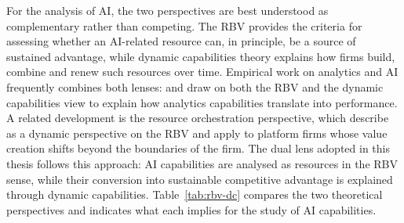 For the analysis of AI, the two perspectives are best understood as complementary rather than competing. The RBV provides the criteria for assessing whether an AI-related resource can, in principle, be a source of sustained advantage, while dynamic capabilities theory explains how firms build, combine and renew such resources over time. Empirical work on analytics and AI frequently combines both lenses: \textcite[356]{fossowamba2017} and \textcite[1]{mikalef2020} draw on both the RBV and the dynamic capabilities view to explain how analytics capabilities translate into performance. A related development is the resource orchestration perspective, which \textcite[451]{zeng2021} describe as a dynamic perspective on the RBV and apply to platform firms whose value creation shifts beyond the boundaries of the firm. The dual lens adopted in this thesis follows this approach: AI capabilities are analysed as resources in the RBV sense, while their conversion into sustainable competitive advantage is explained through dynamic capabilities. Table~\ref{tab:rbv-dc} compares the two theoretical perspectives and indicates what each implies for the study of AI capabilities.

